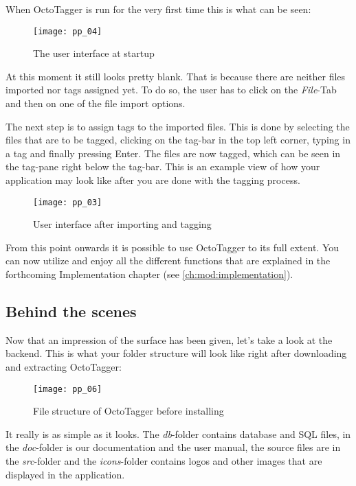 When OctoTagger is run for the very first time this is what can be seen:

\begin{figure}[H]
    \centering
    \texttt{[image: pp\_04]}
    \caption{The user interface at startup}
\end{figure}


At this moment it still looks pretty blank. That is because there are neither files imported nor tags assigned yet. To do so, the user has to click on the \emph{File}-Tab and then on one of the file import options.

The next step is to assign tags to the imported files. This is done by selecting the files that are to be tagged, clicking on the tag-bar in the top left corner, typing in a tag and finally pressing Enter. The files are now tagged, which can be seen in the tag-pane right below the tag-bar.
This is an example view of how your application may look like after you are done with the tagging process.

\begin{figure}[H]
    \centering
	\texttt{[image: pp\_03]}
	\caption{User interface after importing and tagging}
\end{figure}


From this point onwards it is possible to use OctoTagger to its full extent. You can now utilize and enjoy all the different functions that are explained in the forthcoming Implementation chapter (see \cref{ch:mod:implementation}).

\subsection{Behind the scenes}
Now that an impression of the surface has been given, let's take a look at the backend. This is what your folder structure will look like right after downloading and extracting OctoTagger:

\begin{figure}[H]
    \centering
	\texttt{[image: pp\_06]}
	\caption{File structure of OctoTagger before installing}
\end{figure}

It really is as simple as it looks. The \emph{db}-folder contains database and SQL files, in the \emph{doc}-folder is our documentation and the user manual, the source files are in the \emph{src}-folder and the \emph{icons}-folder contains logos and other images that are displayed in the application.

